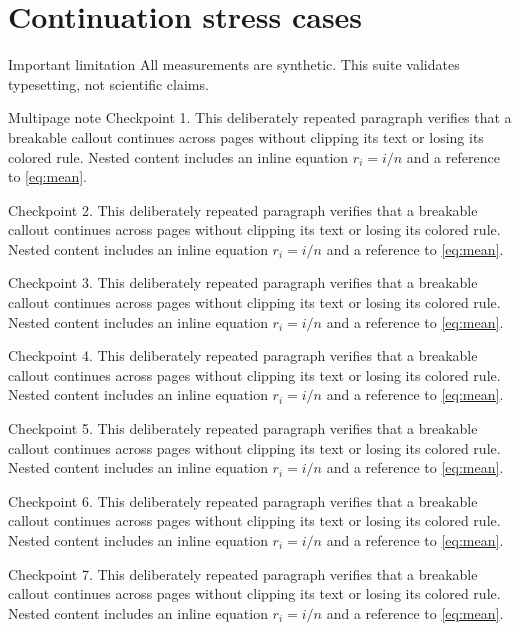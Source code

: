 \documentclass[algorithms,listings]{tempusreport}
\begin{document}
\section{Continuation stress cases}
\begin{reportbox}{Important limitation}
All measurements are synthetic. This suite validates typesetting, not
scientific claims. 
\end{reportbox}
\clearpage
\begin{reportbox}{Multipage note}
Checkpoint 1. This deliberately repeated paragraph verifies that a breakable callout continues across pages without clipping its text or losing its colored rule. Nested content includes an inline equation $r_i=i/n$ and a reference to \cref{eq:mean}.

Checkpoint 2. This deliberately repeated paragraph verifies that a breakable callout continues across pages without clipping its text or losing its colored rule. Nested content includes an inline equation $r_i=i/n$ and a reference to \cref{eq:mean}.

Checkpoint 3. This deliberately repeated paragraph verifies that a breakable callout continues across pages without clipping its text or losing its colored rule. Nested content includes an inline equation $r_i=i/n$ and a reference to \cref{eq:mean}.

Checkpoint 4. This deliberately repeated paragraph verifies that a breakable callout continues across pages without clipping its text or losing its colored rule. Nested content includes an inline equation $r_i=i/n$ and a reference to \cref{eq:mean}.

Checkpoint 5. This deliberately repeated paragraph verifies that a breakable callout continues across pages without clipping its text or losing its colored rule. Nested content includes an inline equation $r_i=i/n$ and a reference to \cref{eq:mean}.

Checkpoint 6. This deliberately repeated paragraph verifies that a breakable callout continues across pages without clipping its text or losing its colored rule. Nested content includes an inline equation $r_i=i/n$ and a reference to \cref{eq:mean}.

Checkpoint 7. This deliberately repeated paragraph verifies that a breakable callout continues across pages without clipping its text or losing its colored rule. Nested content includes an inline equation $r_i=i/n$ and a reference to \cref{eq:mean}.


\end{reportbox}
\end{document}
